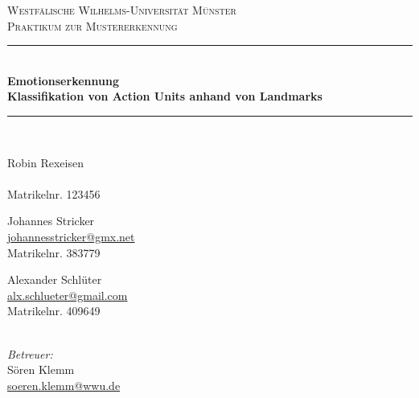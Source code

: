 \begin{titlepage}
	\newcommand{\HRule}{\rule{\linewidth}{0.5mm}} %

	\center %
 

	\textsc{\LARGE Westfälische Wilhelms-Universität Münster}\\[1.5cm] %
	\textsc{\Large Praktikum zur Mustererkennung}\\[0.5cm] %


	\HRule \\[0.4cm]
	
	{\onehalfspacing\huge\sffamily\bfseries Emotionserkennung \\[0.4cm]
    \large Klassifikation von Action Units anhand von Landmarks \singlespacing} %
	\vspace{0.4cm}
	\HRule \\[3cm] 
	
	\begin{minipage}[t]{0.3\textwidth}
	\begin{center} \large
	Robin Rexeisen\\ %
	\normalsize \url{}\\
	Matrikelnr. 123456
	\end{center}
	\end{minipage}
	\quad
	\begin{minipage}[t]{0.3\textwidth}
	\begin{center} \large
	Johannes Stricker\\ 
	\normalsize \url{johannesstricker@gmx.net}\\
	Matrikelnr. 383779
	\end{center}
	\end{minipage}
  \quad
	\begin{minipage}[t]{0.3\textwidth}
	\begin{center} \large
	Alexander Schlüter\\ 
	\normalsize \url{alx.schlueter@gmail.com}\\
	Matrikelnr. 409649
	\end{center}
  \end{minipage}\\[2cm]
  \large
  \emph{Betreuer:}\\
	Sören Klemm\\ 
	\normalsize \url{soeren.klemm@wwu.de}\\


\end{titlepage}
